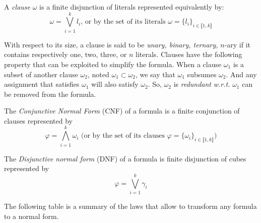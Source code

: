 \begin{definition}[Clause]
A \emph{clause} $\omega$ is a finite disjunction of literals represented equivalently by:
$$\omega = \bigvee_{i=1}^k l_i \text{, or by the set of its literals } \omega = \{l_i\}_{i \in \llbracket 1,k \rrbracket}$$
\end{definition}

With respect to its size, a clause is said to be \emph{unary, binary, ternary,} $n$-ary if it contains respectively one, two, three, or $n$ literals.
Clauses have the following property that can be exploited to simplify the formula.
When a clause $\omega_1$ is a subset of another clause $\omega_2$, noted $\omega_1 \subset \omega_2$,
we say that $\omega_{1}$ subsumes $\omega_{2}$.
 And any assignment that satisfies $\omega_1$ will also satisfy $\omega_2$. So, $\omega_2$ is \emph{redundant} \textit{w.r.t.}  
 $\omega_{1}$ can be removed from the formula.
 
 
\begin{definition}
 The \emph{Conjunctive Normal Form} (CNF) of a formula is a finite conjunction of clauses represented by
 $$\varphi = \bigwedge_{i=1}^k \omega_i \text{ (or by the set of its clauses } \varphi = \{\omega_i\}_{i \in \llbracket 1,k \rrbracket}\text{)}$$
\end{definition}

 \begin{definition}
The \emph{Disjunctive normal form} (DNF) of a formula is finite disjunction of cubes represented by
$$\varphi = \bigvee_{i=1}^k \gamma_i$$
 \end{definition}

The following table is a summary of the laws that allow to transform any formula to
a normal form.

